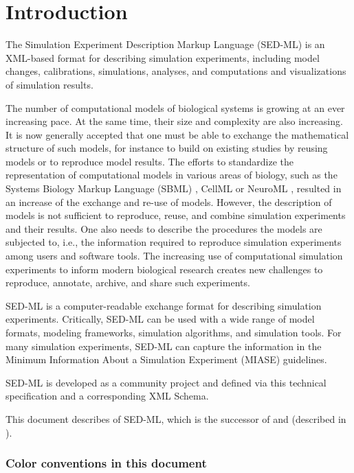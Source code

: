 \chapter{Introduction}
The Simulation Experiment Description Markup Language (SED-ML) is an XML-based format for describing simulation experiments, including model changes, calibrations, simulations, analyses, and computations and visualizations of simulation results.

The number of computational models of biological systems is growing at an ever increasing pace.
At the same time, their size and complexity are also increasing. It is now generally accepted that one must be able to exchange the mathematical structure of such models, for instance to build on existing studies by reusing models or to reproduce model results. The efforts to standardize the representation of computational models in various areas of biology, such as the Systems Biology Markup Language (SBML) \citep{Hucka:2003}, CellML \citep{cuellar:2003} or NeuroML \citep{Goddard:2001}, resulted in an increase of the exchange and re-use of models. However, the description of models is not sufficient to reproduce, reuse, and combine simulation experiments and their results. One also needs to describe the procedures the models are subjected to, i.e., the information required to reproduce simulation experiments among users and software tools. The increasing use of computational simulation experiments to inform modern biological research creates new challenges to reproduce, annotate, archive, and share such experiments.

SED-ML is a computer-readable exchange format for describing simulation experiments. Critically, SED-ML can be used with a wide range of model formats, modeling frameworks, simulation algorithms, and simulation tools. For many simulation experiments, SED-ML can capture the information in the Minimum Information About a Simulation Experiment (MIASE) \citep{Waltemath:2011} guidelines.

SED-ML is developed as a community project and defined via this technical specification and a corresponding XML Schema. 

This document describes \currentLV of SED-ML, which is the successor of \previousLV and \LoneVone (described in \citep{WAB+11}).

\subsection{Color conventions in this document}
\label{sec:notation}

